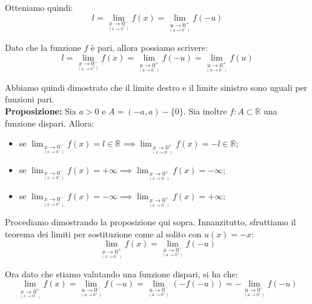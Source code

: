 \documentclass{article}
\begin{document}
\noindent Otteniamo quindi: 
\begin{equation*}
    l = \lim_{\underset{\scriptstyle (x \to 0^+)}{x \to 0^-}} f(x) = \lim_{\underset{\scriptstyle (u \to 0^-)}{u \to 0^+}} f(-u)
\end{equation*}

\noindent Dato che la funzione $f$ è pari, allora possiamo scrivere:
\begin{equation*}
    l = \lim_{\underset{\scriptstyle (x \to 0^+)}{x \to 0^-}} f(x) = \lim_{\underset{\scriptstyle (u \to 0^-)}{u \to 0^+}} f(-u) = \lim_{\underset{\scriptstyle (u \to 0^-)}{u \to 0^+}} f(u)
\end{equation*}

\noindent Abbiamo quindi dimostrato che il limite destro e il limite sinistro sono uguali per funzioni pari.\\

\noindent\textbf{Proposizione:} Sia $a > 0$ e $A = (-a, a) - \{0\}$. Sia inoltre $f: A \subset \mathbb{R}$ una funzione dispari. Allora:
\begin{itemize}
    \item se $\lim_{\underset{\scriptstyle (x \to 0^+)}{x \to 0^-}} f(x) = l \in \mathbb{R} \implies \lim_{\underset{\scriptstyle (x \to 0^-)}{x \to 0^+}} f(x) = -l \in \mathbb{R}$;
    \item se $\lim_{\underset{\scriptstyle (x \to 0^+)}{x \to 0^-}} f(x) = +\infty \implies \lim_{\underset{\scriptstyle (x \to 0^-)}{x \to 0^+}} f(x) = -\infty$;
    \item se $\lim_{\underset{\scriptstyle (x \to 0^+)}{x \to 0^-}} f(x) = -\infty \implies \lim_{\underset{\scriptstyle (x \to 0^-)}{x \to 0^+}} f(x) = +\infty$;
\end{itemize}

\noindent Procediamo dimostrando la proposizione qui sopra. Innanzitutto, sfruttiamo il teorema dei limiti per sostituzione come al solito con $u(x) = -x$:
\begin{equation*}
    \lim_{\underset{\scriptstyle (x \to 0^-)}{x \to 0^+}} f(x) = \lim_{\underset{\scriptstyle (u \to 0^+)}{u \to 0^-}} f(-u)
\end{equation*}

\noindent Ora dato che stiamo valutando una funzione dispari, si ha che:
\begin{equation*}
    \lim_{\underset{\scriptstyle (x \to 0^-)}{x \to 0^+}} f(x) = \lim_{\underset{\scriptstyle (u \to 0^+)}{u \to 0^-}} f(-u) = \lim_{\underset{\scriptstyle (u \to 0^+)}{u \to 0^-}} (-f(-u)) = - \lim_{\underset{\scriptstyle (u \to 0^+)}{u \to 0^-}} f(-u)
\end{equation*}
\end{document}
